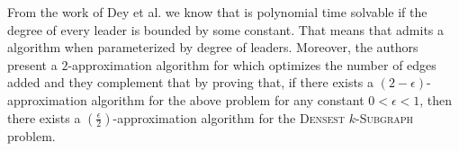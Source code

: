 From the work of Dey et al. \cite{Dey2019} we know that \HLdeg is polynomial time solvable
if the degree of every leader is bounded by some constant.
That means that \HLdeg admits a \FPT algorithm when parameterized by degree of leaders.
Moreover, the authors present a $2$-approximation algorithm for \HLdeg which optimizes
the number of edges added and they complement that by proving that,
if there exists a $(2-\epsilon)$-approximation algorithm for the above problem for any constant $0 < \epsilon < 1$,
then there exists a $(\frac{\epsilon}{2})$-approximation algorithm for the \textsc{Densest} $k$-\textsc{Subgraph} problem.

